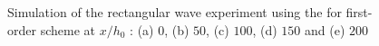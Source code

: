 \documentclass[SingleSpace,12pt]{Serre_ASCE}
\begin{document}
\begin{figure}[htb]
\caption{Simulation of the rectangular wave experiment using the for first-order scheme at $x/h_0$ : (a) $0$, (b) $50$, (c) $100$, (d) $150$ and (e) $200$}
\label{fig:Seguro1}
\end{figure}
%
\end{document}
